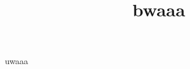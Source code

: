 \documentclass[11pt, letterpaper]{article}
\title{bwaaa}
\begin{document}
\makereport
uwaaa
\end{document}
